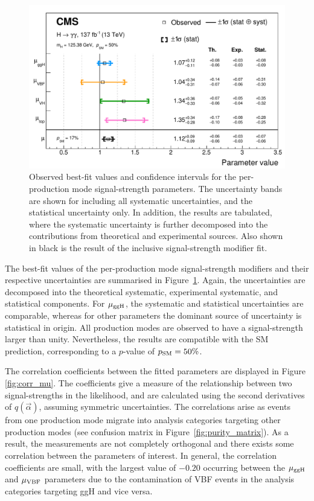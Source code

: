 \begin{figure}[t]
  \centering
  \includegraphics[width=1\textwidth]{Figures/hgg_results/mu_summary.pdf}
  \caption[Summary of the signal-strength fit results]
  {
    Observed best-fit values and confidence intervals for the per-production mode signal-strength parameters. The uncertainty bands are shown for including all systematic uncertainties, and the statistical uncertainty only. In addition, the results are tabulated, where the systematic uncertainty is further decomposed into the contributions from theoretical and experimental sources. Also shown in black is the result of the inclusive signal-strength modifier fit.
  }
  \label{fig:summary_mu}
\end{figure}

The best-fit values of the per-production mode signal-strength modifiers and their respective uncertainties are summarised in Figure~\ref{fig:summary_mu}. Again, the uncertainties are decomposed into the theoretical systematic, experimental systematic, and statistical components. For $\mu_{\rm{ggH}}$, the systematic and statistical uncertainties are comparable, whereas for other parameters the dominant source of uncertainty is statistical in origin. All production modes are observed to have a signal-strength larger than unity. Nevertheless, the results are compatible with the SM prediction, corresponding to a $p$-value of $p_{\rm{SM}}=50\%$.

The correlation coefficients between the fitted parameters are displayed in Figure \ref{fig:corr_mu}. The coefficients give a measure of the relationship between two signal-strengths in the likelihood, and are calculated using the second derivatives of $q(\vec{\alpha})$, assuming symmetric uncertainties. The correlations arise as events from one production mode migrate into analysis categories targeting other production modes (see confusion matrix in Figure~\ref{fig:purity_matrix}). As a result, the measurements are not completely orthogonal and there exists some correlation between the parameters of interest. In general, the correlation coefficients are small, with the largest value of $-0.20$ occurring between the $\mu_{\rm{ggH}}$ and $\mu_{\rm{VBF}}$ parameters due to the contamination of VBF events in the analysis categories targeting ggH and vice versa. 

